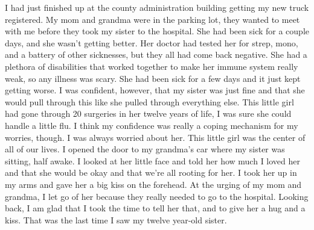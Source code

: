 \documentclass[12pt, letterpaper]{article}
\begin{document}
\begin{flushleft}
I had just finished up at the county administration building
getting my new truck registered.
My mom and grandma were in the parking lot,
they wanted to meet with me before they took my sister to the hospital.
She had been sick for a couple days, and she wasn’t getting better.
Her doctor had tested her for strep, mono, and a battery of other sicknesses,
but they all had come back negative.
She had a plethora of disabilities that worked together to make
her immune system really weak, so any illness was scary.
She had been sick for a few days and it just kept getting worse.
I was confident, however, that my sister was just fine and that she would pull
through this like she pulled through everything else.
This little girl had gone through 20 surgeries in her twelve years of life,
I was sure she could handle a little flu.
I think my confidence was really a coping mechanism for my worries, though.
I was always worried about her.
This little girl was the center of all of our lives.
I opened the door to my grandma’s car where my sister was sitting, half awake.
I looked at her little face and told her how much I loved her and that
she would be okay and that we’re all rooting for her.
I took her up in my arms and gave her a big kiss on the forehead.
At the urging of my mom and grandma,
I let go of her because they really needed to go to the hospital.
Looking back, I am glad that I took the time to tell her that,
and to give her a hug and a kiss.
That was the last time I saw my twelve year-old sister. 
\vspace{5mm}





\end{flushleft}
\end{document}
